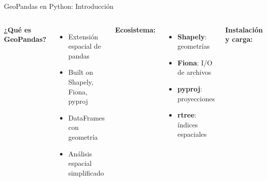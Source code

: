 \documentclass[10pt,aspectratio=169]{beamer}
\begin{document}
\begin{frame}[fragile]{GeoPandas en Python: Introducción}
    \begin{columns}[T]
        \textbf{¿Qué es GeoPandas?}
        \begin{itemize}
            \item Extensión espacial de pandas
            \item Built on Shapely, Fiona, pyproj
            \item DataFrames con geometría
            \item Análisis espacial simplificado
        \end{itemize}
        
        \vspace{0.3cm}
        \textbf{Ecosistema:}
        \begin{itemize}
            \item \textbf{Shapely}: geometrías
            \item \textbf{Fiona}: I/O de archivos
            \item \textbf{pyproj}: proyecciones
            \item \textbf{rtree}: índices espaciales
        \end{itemize}
        
        \textbf{Instalación y carga:}
        \begin{lstlisting}[language=Python]
# Instalación
pip install geopandas
# o con conda
conda install -c conda-forge geopandas

# Importación
import geopandas as gpd
import pandas as pd
from shapely.geometry import Point
import matplotlib.pyplot as plt
        \end{lstlisting}
    \end{columns}
\end{frame}
\end{document}

